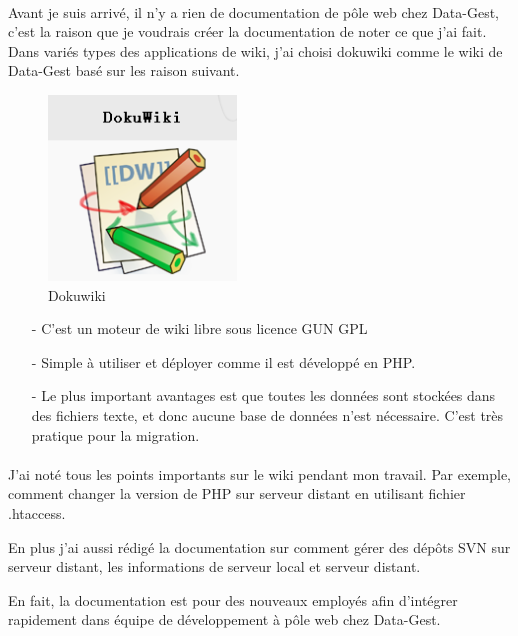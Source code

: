 \paragraph{}
Avant je suis arrivé, il n'y a rien de documentation de pôle web chez Data-Gest, c'est la raison que je voudrais créer la documentation de noter ce que j'ai fait. Dans variés types des applications de wiki, j'ai choisi dokuwiki comme le wiki de Data-Gest basé sur les raison suivant.
\begin{figure}[hbtp]
\centering
\includegraphics[width=5cm]{body/images/dukowiki.png}
\caption{Dokuwiki}
\end{figure}
\begin{itemize}
\item [-] C'est un moteur de wiki libre sous licence GUN GPL
\item [-] Simple à utiliser et déployer comme il est développé en PHP.
\item [-] Le plus important avantages est que toutes les données sont stockées dans des fichiers texte, et donc aucune base de données n’est nécessaire. C'est très pratique pour la migration.
\end{itemize}

\paragraph{}
J'ai noté tous les points importants sur le wiki pendant mon travail. Par exemple, comment changer la version de PHP sur serveur distant en utilisant fichier .htaccess. 

En plus j'ai aussi rédigé la documentation sur comment gérer des dépôts SVN sur serveur distant, les informations de serveur local et serveur distant. 

En fait, la documentation est pour des nouveaux employés afin d'intégrer rapidement dans équipe de développement à pôle web chez Data-Gest. 

